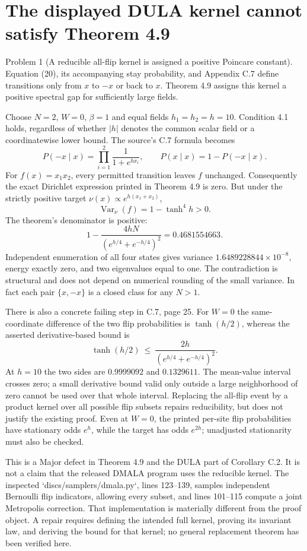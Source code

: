 \documentclass[10pt]{article}
\begin{document}
\section*{The displayed DULA kernel cannot satisfy Theorem 4.9}
Problem 1 (A reducible all-flip kernel is assigned a positive Poincare constant).  Equation (20), its accompanying stay probability, and Appendix C.7 define transitions only from \(x\) to \(-x\) or back to \(x\). Theorem 4.9 assigns this kernel a positive spectral gap for sufficiently large fields.\par
Choose \(N=2\), \(W=0\), \(\beta=1\) and equal fields \(h_1=h_2=h=10\). Condition 4.1 holds, regardless of whether \(|h|\) denotes the common scalar field or a coordinatewise lower bound. The source’s C.7 formula becomes \[P(-x\mid x)=\prod_{i=1}^2\frac1{1+e^{hx_i}},\qquad
 P(x\mid x)=1-P(-x\mid x).\] For \(f(x)=x_1x_2\), every permitted transition leaves \(f\) unchanged. Consequently the exact Dirichlet expression printed in Theorem 4.9 is zero. But under the strictly positive target \(\nu(x)\propto e^{h(x_1+x_2)}\), \[\operatorname{Var}_{\nu}(f)=1-\tanh^4h>0.\] The theorem’s denominator is positive: \[1-\frac{4hN}{(e^{h/4}+e^{-h/4})^2}=0.4681554663.\] Independent enumeration of all four states gives variance \(1.6489228844\times10^{-8}\), energy exactly zero, and two eigenvalues equal to one. The contradiction is structural and does not depend on numerical rounding of the small variance. In fact each pair \(\{x,-x\}\) is a closed class for any \(N>1\).\par
There is also a concrete failing step in C.7, page 25. For \(W=0\) the same-coordinate difference of the two flip probabilities is \(\tanh(h/2)\), whereas the asserted derivative-based bound is \[\tanh(h/2)\ \leq\ \frac{2h}{(e^{h/4}+e^{-h/4})^2}.\] At \(h=10\) the two sides are \(0.9999092\) and \(0.1329611\). The mean-value interval crosses zero; a small derivative bound valid only outside a large neighborhood of zero cannot be used over that whole interval. Replacing the all-flip event by a product kernel over all possible flip subsets repairs reducibility, but does not justify the existing proof. Even at \(W=0\), the printed per-site flip probabilities have stationary odds \(e^h\), while the target has odds \(e^{2h}\); unadjusted stationarity must also be checked.\par
This is a Major defect in Theorem 4.9 and the DULA part of Corollary C.2. It is not a claim that the released DMALA program uses the reducible kernel. The inspected `discs/samplers/dmala.py`, lines 123–139, samples independent Bernoulli flip indicators, allowing every subset, and lines 101–115 compute a joint Metropolis correction. That implementation is materially different from the proof object. A repair requires defining the intended full kernel, proving its invariant law, and deriving the bound for that kernel; no general replacement theorem has been verified here.\par
\end{document}
